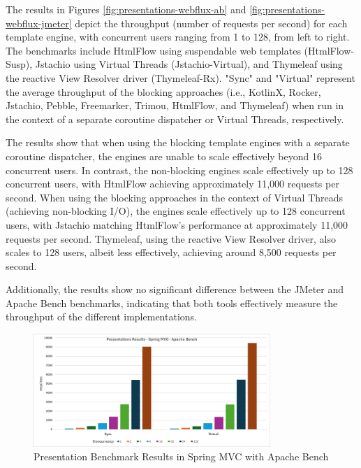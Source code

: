 \documentclass[../ppG48.tex]{subfiles}
\begin{document}
The results in Figures \ref{fig:presentations-webflux-ab} and \ref{fig:presentations-webflux-jmeter} depict the throughput (number of requests per second) for each template engine, with concurrent users ranging from 1 to 128, from left to right. The benchmarks include HtmlFlow using suspendable web templates (HtmlFlow-Susp), Jstachio using Virtual Threads (Jstachio-Virtual), and Thymeleaf using the reactive View Resolver driver (Thymeleaf-Rx). "Sync" and "Virtual" represent the average throughput of the blocking approaches (i.e., KotlinX, Rocker, Jstachio, Pebble, Freemarker, Trimou, HtmlFlow, and Thymeleaf) when run in the context of a separate coroutine dispatcher or Virtual Threads, respectively.

The results show that when using the blocking template engines with a separate coroutine dispatcher, the engines are unable to scale effectively beyond 16 concurrent users. In contrast, the non-blocking engines scale effectively up to 128 concurrent users, with HtmlFlow achieving approximately 11,000 requests per second. When using the blocking approaches in the context of Virtual Threads (achieving non-blocking I/O), the engines scale effectively up to 128 concurrent users, with Jstachio matching HtmlFlow's performance at approximately 11,000 requests per second. Thymeleaf, using the reactive View Resolver driver, also scales to 128 users, albeit less effectively, achieving around 8,500 requests per second.

Additionally, the results show no significant difference between the JMeter and Apache Bench benchmarks, indicating that both tools effectively measure the throughput of the different implementations.

\begin{figure}[h]
\centering \includegraphics[width=0.8\textwidth]{../Graphs/presentations-springmvc-ab.png} \caption{Presentation Benchmark Results in Spring MVC with Apache Bench} \label{fig:presentations-springmvc-ab} \end{figure}
\end{document}
